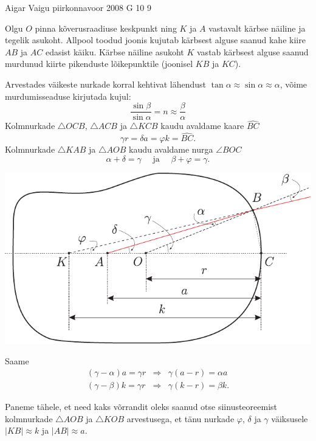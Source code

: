 \documentclass[11pt]{article}
\begin{document}
{%
{Aigar Vaigu} %
{piirkonnavoor} %
{2008} %
{G 10} %
{9} %
{

\ifSolution
Olgu $O$ pinna kõverusraadiuse keskpunkt ning $K$ ja $A$ vastavalt kärbse näiline ja tegelik asukoht. Allpool toodud joonis kujutab kärbsest alguse saanud kahe kiire $AB$ ja $AC$ edasist käiku. Kärbse näiline asukoht $K$ vastab kärbsest alguse saanud murdunud kiirte pikenduste lõikepunktile (joonisel $KB$ ja $KC$).

Arvestades väikeste nurkade korral kehtivat lähendust $\tan \alpha \approx \sin \alpha \approx \alpha$, võime murdumisseaduse kirjutada kujul:
\[
\frac{\sin \beta}{\sin \alpha}=n \approx \frac{\beta}{\alpha}
\]
Kolmnurkade $\triangle OCB$, $\triangle ACB$ ja $\triangle KCB$ kaudu avaldame kaare $\widehat{BC}$
\[
\gamma r=\delta a=\varphi k=\widehat{BC}.
\]
Kolmnurkade $\triangle KAB$ ja $\triangle AOB$ kaudu avaldame nurga $\angle BOC$
\[
\alpha+\delta=\gamma \quad \text { ja } \quad \beta+\varphi=\gamma.
\]

\begin{center}
	\includegraphics[width=\linewidth]{2008-v2g-10-lah}
\end{center}

Saame
\[
\begin{array}{lll}{(\gamma-\alpha) a=\gamma r} & {\Rightarrow} & {\gamma(a-r)=\alpha a} \\ {(\gamma-\beta) k=\gamma r} & {\Rightarrow} & {\gamma(k-r)=\beta k.}\end{array}
\]

Paneme tähele, et need kaks võrrandit oleks saanud otse siinusteoreemist kolmnurkade $\triangle AOB$ ja $\triangle KOB$ arvestusega, et tänu nurkade $\varphi$, $\delta$ ja $\gamma$ väiksusele $|KB| \approx k$ ja $|AB| \approx a$.

}}
\end{document}

